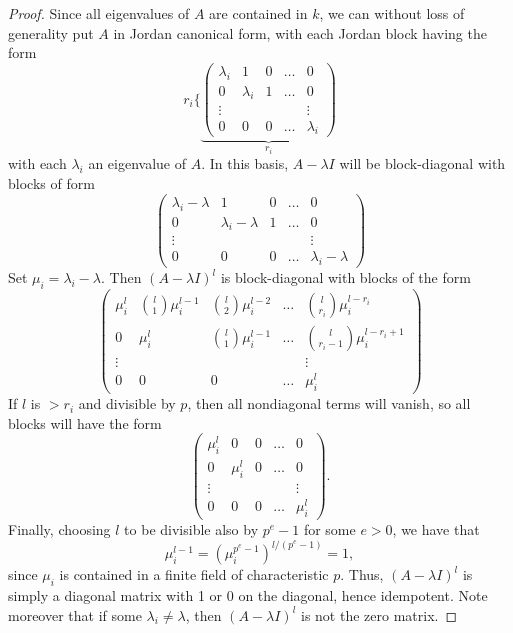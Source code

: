\documentclass{article}
\let\l\lambda
\numberwithin{equation}{section}
\theoremstyle{theorem}
\numberwithin{thm}{section}
\theoremstyle{definition}
\begin{document}
\begin{proof}
Since all eigenvalues of $A$ are contained in $k$, we can without loss of generality put $A$ in Jordan canonical form, with each Jordan block having the form
$$
r_i\Biggl\{
\underbrace{\begin{pmatrix}
\l_i & 1 & 0 &\dots & 0
\\
0& \l_i & 1  &\dots & 0
\\
\vdots & &&&\vdots
\\
0& 0 & 0  &\dots & \l_i
\end{pmatrix}}_{r_i}
$$
with each $\l_i$ an eigenvalue of $A$.
In this basis, $A-\l I$ will be block-diagonal with blocks of form
$$
\begin{pmatrix}
\l_i-\l & 1 & 0 &\dots & 0
\\
0& \l_i-\l & 1  &\dots & 0
\\
\vdots & &&&\vdots
\\
0& 0 & 0  &\dots & \l_i-\l
\end{pmatrix}
$$
Set $\mu_i=\l_i-\l$. Then $(A-\l I)^l$ is block-diagonal with blocks of the form
$$
\begin{pmatrix}
\mu_i^l & \binom{l}1\mu_i^{l-1} & \binom{l}2\mu_i^{l-2} &\dots & \binom{l}{r_i}\mu_i^{l-r_i}
\\
0& \mu_i^l &
\binom{l}1\mu_i^{l-1}  &\dots & \binom{l}{r_i-1}\mu_i^{l-r_i+1}
\\
\vdots & &&&\vdots
\\
0& 0 & 0  &\dots & \mu_i^l
\end{pmatrix}
$$
If $l$ is $> r_i$ and divisible by $p$, then all nondiagonal terms will vanish, so all blocks will have the form
$$
\begin{pmatrix}
\mu_i^l & 0 & 0 &\dots & 0
\\
0& \mu_i^l & 0  &\dots & 0
\\
\vdots & &&&\vdots
\\
0& 0 & 0  &\dots & \mu_i^l 
\end{pmatrix}.
$$
Finally, choosing $l$ to be divisible also by $p^e-1$ for some $e>0$, we have that $$\mu_i^{l-1} = (\mu_i^{p^{e}-1})^{l/(p^{e}-1)} =1,$$ since $\mu_i$ is contained in a finite field of characteristic $p$.
Thus, $(A-\l I)^l$ is simply a diagonal matrix with 1 or 0 on the diagonal, hence idempotent. Note moreover that if some $\l_i\neq \l$, then $(A-\l I)^l$ is not the zero matrix.

\end{proof}
\end{document}
